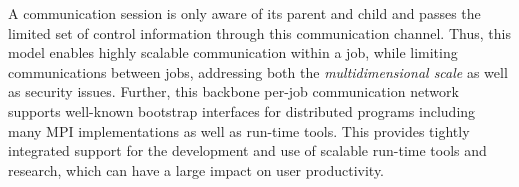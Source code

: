A communication session is only aware of its parent 
and child and passes the limited set of control information 
through this communication channel. Thus, this model 
enables highly scalable communication within a job, while 
limiting communications between jobs, addressing 
both the {\em multidimensional scale} as well as security issues.
Further, this backbone per-job communication network 
supports well-known bootstrap interfaces 
for distributed programs including many MPI implementations 
as well as run-time tools.  This provides tightly integrated support
for the development and use of scalable run-time tools
and research, which can have a large impact on user productivity.
